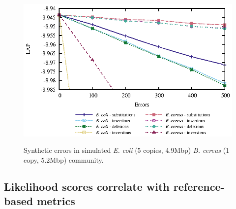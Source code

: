 \documentclass[12pt,\mydriver]{thesis}
\begin{document}
\begin{figure}[htb!]
\begin{center}
\includegraphics[width=.8\textwidth]{errors}
\end{center}
\renewcommand{\baselinestretch}{1}
\small\normalsize
\begin{quote}
\caption[Synthetic errors in simulated \emph{E. coli} and \emph{B. cereus} (1 copy, 5.2Mbp) community]{Synthetic errors in simulated \emph{E. coli} (5 copies, 4.9Mbp) \emph{B. cereus} (1 copy, 5.2Mbp) community.}
\label{fig:errors}
\end{quote}
\end{figure}
\renewcommand{\baselinestretch}{2}
\small\normalsize

\subsection{Likelihood scores correlate with reference-based metrics}
\end{document}
